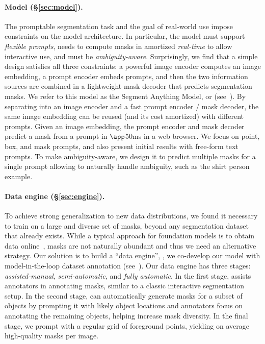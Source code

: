 \paragraph{Model (\S\ref{sec:model}).} The promptable segmentation task and the goal of real-world use impose constraints on the model architecture. In particular, the model must support \emph{flexible prompts}, needs to compute masks in amortized \emph{real-time} to allow interactive use, and must be \emph{ambiguity-aware}. Surprisingly, we find that a simple design satisfies all three constraints: a powerful image encoder computes an image embedding, a prompt encoder embeds prompts, and then the two information sources are combined in a lightweight mask decoder that predicts segmentation masks. We refer to this model as the Segment Anything Model, or \sam (see~). By separating \sam into an image encoder and a fast prompt encoder / mask decoder, the same image embedding can be reused (and its cost amortized) with different prompts. Given an image embedding, the prompt encoder and mask decoder predict a mask from a prompt in $\app$50ms in a web browser. We focus on point, box, and mask prompts, and also present initial results with free-form text prompts. To make \sam ambiguity-aware, we design it to predict multiple masks for a single prompt allowing \sam to naturally handle ambiguity, such as the shirt \vs person example.

\paragraph{Data engine (\S\ref{sec:engine}).} To achieve strong generalization to new data distributions, we found it necessary to train \sam on a large and diverse set of masks, beyond any segmentation dataset that already exists. While a typical approach for foundation models is to obtain data online~\cite{Radford2021}, masks are not naturally abundant and thus we need an alternative strategy. Our solution is to build a ``data engine'', \ie, we co-develop our model with model-in-the-loop dataset annotation (see~). Our data engine has three stages: \emph{assisted-manual}, \emph{semi-automatic}, and \emph{fully automatic}. In the first stage, \sam assists annotators in annotating masks, similar to a classic interactive segmentation setup. In the second stage, \sam can automatically generate masks for a subset of objects by prompting it with likely object locations and annotators focus on annotating the remaining objects, helping increase mask diversity. In the final stage, we prompt \sam with a regular grid of foreground points, yielding on average  high-quality masks per image.

